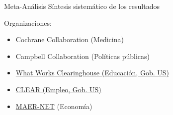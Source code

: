 \documentclass{beamer}
\begin{document}
{ %
    \begin{frame}[plain, label=AEAreg]
     \end{frame}
}

\begin{frame}{Meta-Análisis}
Síntesis sistemático de los resultados

\vspace{.2in}
Organizaciones:
\begin{itemize}[<.->]
\item Cochrane Collaboration (Medicina)
\item Campbell Collaboration (Políticas públicas)
\item \href{http://ies.ed.gov/ncee/wwc/}{What Works Clearinghouse (Educación, Gob. US)}
\item \href{http://clear.dol.gov/}{CLEAR (Empleo, Gob. US)}
\item \href{https://www.hendrix.edu/maer-network/}{MAER-NET} (Economía)
\end{itemize}
\end{frame}
\end{document}
